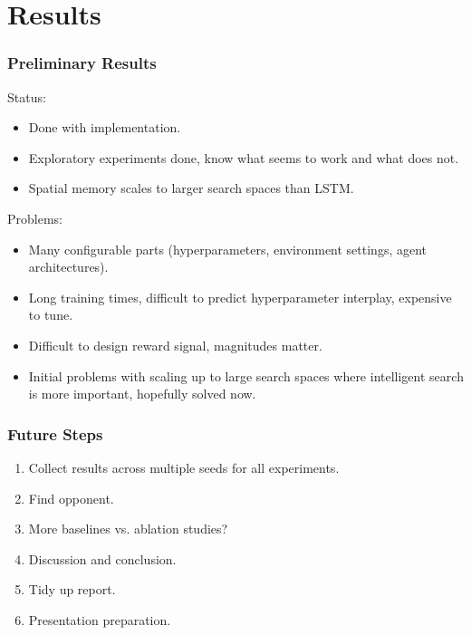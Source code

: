 \section{Results}

\begin{frame}
    \frametitle{Preliminary Results}

    Status:

    \begin{itemize}
        \item Done with implementation.
        \item Exploratory experiments done, know what seems to work and what does not.
        \item Spatial memory scales to larger search spaces than LSTM.
    \end{itemize}

    Problems:

    \begin{itemize}
        \item Many configurable parts (hyperparameters, environment settings, agent architectures).
        \item Long training times, difficult to predict hyperparameter interplay, expensive to tune.
        \item Difficult to design reward signal, magnitudes matter.
        \item Initial problems with scaling up to large search spaces where intelligent search is more important, hopefully solved now.
    \end{itemize}
\end{frame}

\begin{frame}
    \frametitle{Future Steps}

    \begin{enumerate}
        \item Collect results across multiple seeds for all experiments.
        \item Find opponent.
        \item More baselines vs. ablation studies?
        \item Discussion and conclusion.
        \item Tidy up report.
        \item Presentation preparation.
    \end{enumerate}
\end{frame}
